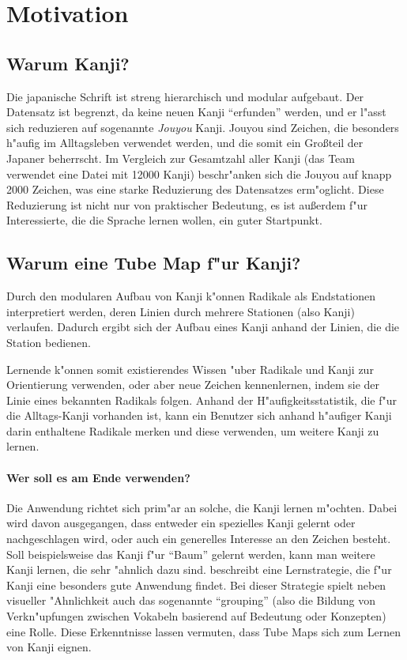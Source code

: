 \section{Motivation}
\subsection{Warum Kanji?}
Die japanische Schrift ist streng hierarchisch und modular aufgebaut. Der Datensatz ist begrenzt, da keine neuen Kanji "`erfunden"' werden, und er l"asst sich reduzieren auf sogenannte \emph{Jouyou} Kanji. Jouyou sind Zeichen, die besonders h"aufig im Alltagsleben verwendet werden, und die somit ein Gro\ss teil der Japaner beherrscht. Im Vergleich zur Gesamtzahl aller Kanji (das Team verwendet eine Datei mit 12000 Kanji) beschr"anken sich die Jouyou auf knapp 2000 Zeichen, was eine starke Reduzierung des Datensatzes erm"oglicht.
Diese Reduzierung ist nicht nur von praktischer Bedeutung, es ist au\ss erdem f"ur Interessierte, die die Sprache lernen wollen, ein guter Startpunkt. 

\subsection{Warum eine Tube Map f"ur Kanji?}
Durch den modularen Aufbau von Kanji k"onnen Radikale als Endstationen interpretiert werden, deren Linien durch mehrere Stationen (also Kanji) verlaufen. Dadurch ergibt sich der Aufbau eines Kanji anhand der Linien, die die Station bedienen. 

Lernende k"onnen somit existierendes Wissen "uber Radikale und Kanji zur Orientierung verwenden, oder aber neue Zeichen kennenlernen, indem sie der Linie eines bekannten Radikals folgen. Anhand der H"aufigkeitsstatistik, die f"ur die Alltags-Kanji vorhanden ist, kann ein Benutzer sich anhand h"aufiger Kanji darin enthaltene Radikale merken und diese verwenden, um weitere Kanji zu lernen. 
\paragraph{Wer soll es am Ende verwenden?}
Die Anwendung richtet sich prim"ar an solche, die Kanji lernen m"ochten. Dabei wird davon ausgegangen, dass entweder ein spezielles Kanji gelernt oder nachgeschlagen wird, oder auch ein generelles Interesse an den Zeichen besteht. Soll beispielsweise das Kanji f"ur "`Baum"' gelernt werden, kann man weitere Kanji lernen, die sehr "ahnlich dazu sind.  
\cite{kanjilearningjapanese10} beschreibt eine Lernstrategie, die f"ur Kanji eine besonders gute Anwendung findet. Bei dieser Strategie spielt neben visueller "Ahnlichkeit auch das sogenannte "`grouping"' (also die Bildung von Verkn"upfungen zwischen Vokabeln basierend auf Bedeutung oder Konzepten) eine Rolle. Diese Erkenntnisse lassen vermuten, dass Tube Maps sich zum Lernen von Kanji eignen.
